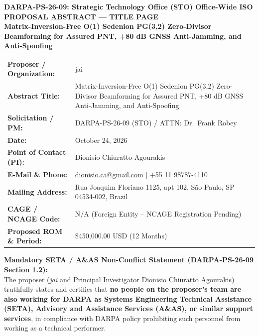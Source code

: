 \documentclass[12pt,letterpaper]{article}
\begin{document}
\thispagestyle{empty}
\begin{center}
    {\large \textbf{DARPA-PS-26-09: Strategic Technology Office (STO) Office-Wide ISO}}\\[2pt]
    {\normalsize \textbf{PROPOSAL ABSTRACT --- TITLE PAGE}}\\[6pt]
    {\Large \textbf{Matrix-Inversion-Free O(1) Sedenion PG(3,2) Zero-Divisor Beamforming for Assured PNT, +80 dB GNSS Anti-Jamming, and Anti-Spoofing}}\\[8pt]
\end{center}

\begin{tabular}{@{}p{2.1in}p{4.2in}@{}}
\toprule
\textbf{Proposer / Organization:} & jai \\
\textbf{Abstract Title:} & Matrix-Inversion-Free O(1) Sedenion PG(3,2) Zero-Divisor Beamforming for Assured PNT, +80 dB GNSS Anti-Jamming, and Anti-Spoofing \\
\textbf{Solicitation / PM:} & DARPA-PS-26-09 (STO) / ATTN: Dr.\ Frank Robey \\
\textbf{Date:} & October 24, 2026 \\
\textbf{Point of Contact (PI):} & Dionisio Chiuratto Agourakis \\
\textbf{E-Mail \& Phone:} & \href{mailto:dionisio.ca@gmail.com}{dionisio.ca@gmail.com} \quad | \quad +55 11 98787-4110 \\
\textbf{Mailing Address:} & Rua Joaquim Floriano 1125, apt 102, S\~ao Paulo, SP 04534-002, Brazil \\
\textbf{CAGE / NCAGE Code:} & N/A (Foreign Entity -- NCAGE Registration Pending) \\
\textbf{Proposed ROM \& Period:} & \$450,000.00 USD (12 Months) \\
\bottomrule
\end{tabular}

\vspace{6pt}
\textbf{Mandatory SETA / A\&AS Non-Conflict Statement (DARPA-PS-26-09 Section 1.2):}\\
The proposer (\textit{jai} and Principal Investigator Dionisio Chiuratto Agourakis) truthfully states and certifies that \textbf{no people on the proposer's team are also working for DARPA as Systems Engineering Technical Assistance (SETA), Advisory and Assistance Services (A\&AS), or similar support services}, in compliance with DARPA policy prohibiting such personnel from working as a technical performer.
\end{document}
